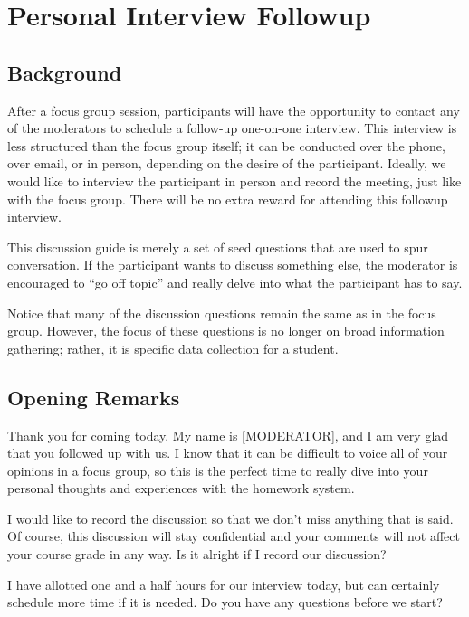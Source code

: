 \chapter[Personal Interview Followup]{Personal Interview Followup}

\section{Background}

After a focus group session, participants will have the opportunity to contact any of the moderators to schedule a follow-up one-on-one interview. This interview is less structured than the focus group itself; it can be conducted over the phone, over email, or in person, depending on the desire of the participant. Ideally, we would like to interview the participant in person and record the meeting, just like with the focus group. There will be no extra reward for attending this followup interview.

This discussion guide is merely a set of seed questions that are used to spur conversation. If the participant wants to discuss something else, the moderator is encouraged to ``go off topic'' and really delve into what the participant has to say.

Notice that many of the discussion questions remain the same as in the focus group. However, the focus of these questions is no longer on broad information gathering; rather, it is specific data collection for a student.

\section{Opening Remarks}

Thank you for coming today. My name is [MODERATOR], and I am very glad that you followed up with us. I know that it can be difficult to voice all of your opinions in a focus group, so this is the perfect time to really dive into your personal thoughts and experiences with the homework system.

I would like to record the discussion so that we don’t miss anything that is said. Of course, this discussion will stay confidential and your comments will not affect your course grade in any way. Is it alright if I record our discussion?

I have allotted one and a half hours for our interview today, but can certainly schedule more time if it is needed. Do you have any questions before we start?


